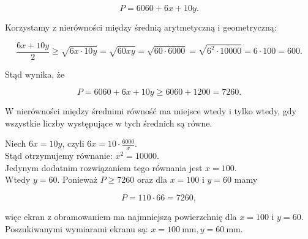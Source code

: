 \documentclass[10pt]{article}
\begin{document}
$$
P=6060+6 x+10 y .
$$

Korzystamy z nierówności między średnią arytmetyczną i geometryczną:

$$
\frac{6 x+10 y}{2} \geq \sqrt{6 x \cdot 10 y}=\sqrt{60 x y}=\sqrt{60 \cdot 6000}=\sqrt{6^{2} \cdot 10000}=6 \cdot 100=600 .
$$

Stąd wynika, że

$$
P=6060+6 x+10 y \geq 6060+1200=7260 .
$$

W nierówności między średnimi równość ma miejsce wtedy i tylko wtedy, gdy wszystkie liczby występujące w tych średnich są równe.

Niech $6 x=10 y$, czyli $6 x=10 \cdot \frac{6000}{x}$.\\
Stąd otrzymujemy równanie: $x^{2}=10000$.\\
Jedynym dodatnim rozwiązaniem tego równania jest $x=100$.\\
Wtedy $y=60$. Ponieważ $P \geq 7260$ oraz dla $x=100$ i $y=60$ mamy

$$
P=110 \cdot 66=7260,
$$

więc ekran z obramowaniem ma najmniejszą powierzchnię dla $x=100$ i $y=60$.\\
Poszukiwanymi wymiarami ekranu są: $x=100 \mathrm{~mm}, y=60 \mathrm{~mm}$.
\end{document}
